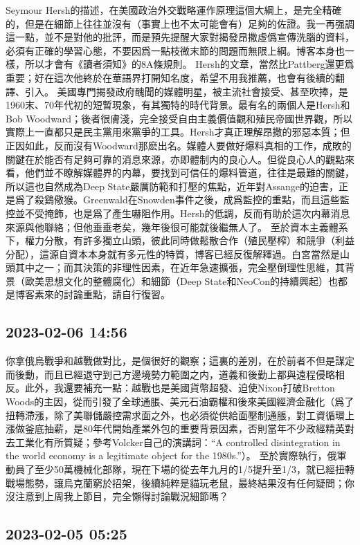 \documentclass[twocolumn]{ctexart}
\begin{document}
Seymour Hersh的描述，在美國政治外交戰略運作原理這個大綱上，是完全精確的，但是在細節上往往並沒有（事實上也不太可能會有）足夠的佐證。我一再强調這一點，並不是對他的批評，而是預先提醒大家對揭發昂撒虛僞宣傳洗腦的資料，必須有正確的學習心態，不要因爲一點枝微末節的問題而無限上綱。博客本身也一樣，所以才會有《讀者須知》的8A條規則。
Hersh的文章，當然比Pattberg還更爲重要；好在這次他終於在華語界打開知名度，希望不用我推薦，也會有後續的翻譯、引入。
美國專門揭發政府醜聞的媒體明星，被主流社會接受、甚至吹捧，是1960末、70年代初的短暫現象，有其獨特的時代背景。最有名的兩個人是Hersh和Bob Woodward；後者很膚淺，完全接受自由主義價值觀和殖民帝國世界觀，所以實際上一直都只是民主黨用來黨爭的工具。Hersh才真正理解昂撒的邪惡本質；但正因如此，反而沒有Woodward那麽出名。媒體人要做好爆料真相的工作，成敗的關鍵在於能否有足夠可靠的消息來源，亦即體制内的良心人。但從良心人的觀點來看，他們並不瞭解媒體界的内幕，要找到可信任的爆料管道，往往是最難的關鍵，所以這也自然成為Deep State嚴厲防範和打壓的焦點，近年對Assange的迫害，正是爲了殺鷄儆猴。Greenwald在Snowden事件之後，成爲監控的重點，而且這些監控並不受掩飾，也是爲了產生嚇阻作用。Hersh的低調，反而有助於這次内幕消息來源與他聯絡；但他垂垂老矣，幾年後很可能就後繼無人了。
至於資本主義體系下，權力分散，有許多獨立山頭，彼此同時做鬆散合作（殖民壓榨）和競爭（利益分配），這源自資本本身就有多元性的特質，博客已經反復解釋過。白宮當然是山頭其中之一；而其決策的非理性因素，在近年急速擴張，完全壓倒理性思維，其背景（歐美思想文化的整體腐化）和細節（Deep State和NeoCon的持續興起）也都是博客素來的討論重點，請自行復習。
\subsection*{2023-02-06 14:56}

你拿俄烏戰爭和越戰做對比，是個很好的觀察；這裏的差別，在於前者不但是謀定而後動，而且已經退守到己方邊境勢力範圍之内，道義和後勤上都與遠程侵略相反。此外，我還要補充一點：越戰也是美國貨幣超發、迫使Nixon打破Bretton Woods的主因，從而引發了全球通脹、美元石油霸權和後來美國經濟金融化（爲了扭轉滯漲，除了美聯儲嚴控需求面之外，也必須從供給面壓制通脹，對工資循環上漲做釜底抽薪，是80年代開始產業外包的重要背景因素，否則當年不少政經精英對去工業化有所質疑；參考Volcker自己的演講詞：“A controlled disintegration in the world economy is a legitimate object for the 1980s.”）。
至於實際執行，俄軍動員了至少50萬機械化部隊，現在下場的從去年九月的1/5提升至1/3，就已經扭轉戰場態勢，讓烏克蘭窮於招架，後續純粹是貓玩老鼠，最終結果沒有任何疑問；你沒注意到上周我上節目，完全懶得討論戰況細節嗎？
\subsection*{2023-02-05 05:25}
\end{document}
